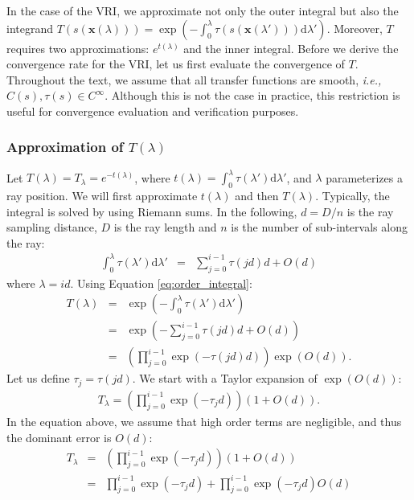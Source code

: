 In the case of the VRI, we approximate not only the outer integral but
also the integrand $T(s(\mathbf{x}(\lambda))) =
\exp\left(-\int_0^{\lambda} \tau(s(\mathbf{x}(\lambda')))
\mathrm{d}\lambda' \right)$. Moreover, $T$ requires two
approximations: $e^{t(\lambda)}$ and the inner integral. Before we derive the
convergence rate for the VRI, let us first evaluate the convergence of
$T$. Throughout the text, we assume that all transfer functions are
smooth, {\em i.e.,} $C(s), \tau(s) \in C^\infty$. Although
this is not the case in practice, this restriction is useful for convergence
evaluation and verification purposes.

\subsubsection{Approximation of $T(\lambda)$}
\label{appx:approximationT}

Let $T(\lambda) = T_\lambda = e^{-t(\lambda)}$, where $t(\lambda) = \int_0^{\lambda} \tau(\lambda')
\mathrm{d}\lambda'$, and $\lambda$ parameterizes a ray position. We
will first approximate $t(\lambda)$ and then $T(\lambda)$. Typically, the
integral is solved by using Riemann sums. 
In the following, $d = D / n$ is the ray sampling distance, 
$D$ is the ray length and $n$ is the number of sub-intervals along the ray:
\begin{eqnarray}
\int_0^{\lambda} \tau(\lambda') \mathrm{d}\lambda' & = &
\sum_{j=0}^{i-1}\tau(j d) d + O(d) \label{eq:order_integral}
\end{eqnarray}
%
where $\lambda = i d$. Using Equation \eqref{eq:order_integral}:
\begin{eqnarray}
T(\lambda) &=& \exp\left(-\int_0^{\lambda} \tau(\lambda')
\mathrm{d}\lambda'\right)\\ 
 & = & \exp\left(-\sum_{j=0}^{i-1}\tau(j d) d + O(d)\right)\\ 
& = & \left(\prod_{j=0}^{i-1}\exp\left(-\tau(j d) d\right)\right)
\exp\left(O(d)\right). 
\end{eqnarray}
%
Let us define $\tau_j = \tau(j d)$. We start with a Taylor expansion
of $\exp\left(O(d)\right)$:
%
\begin{eqnarray}
T_\lambda = \left(\prod_{j=0}^{i-1}\exp\left(-\tau_j
d\right)\right) \left(1 + O(d) \right).
\end{eqnarray}
In the equation above, we assume that high order terms are
negligible, and thus the dominant
error is $O(d)$:
\begin{eqnarray}
T_\lambda
& = & \left(\prod_{j=0}^{i-1}\exp\left(-\tau_j d\right)\right) \left(1 +
O(d)\right)\\
& = & \prod_{j=0}^{i-1}\exp\left(-\tau_j d\right) + \prod_{j=0}^{i-1}\exp\left(-\tau_j d\right)O(d)  \label{eq:m}
\end{eqnarray}

